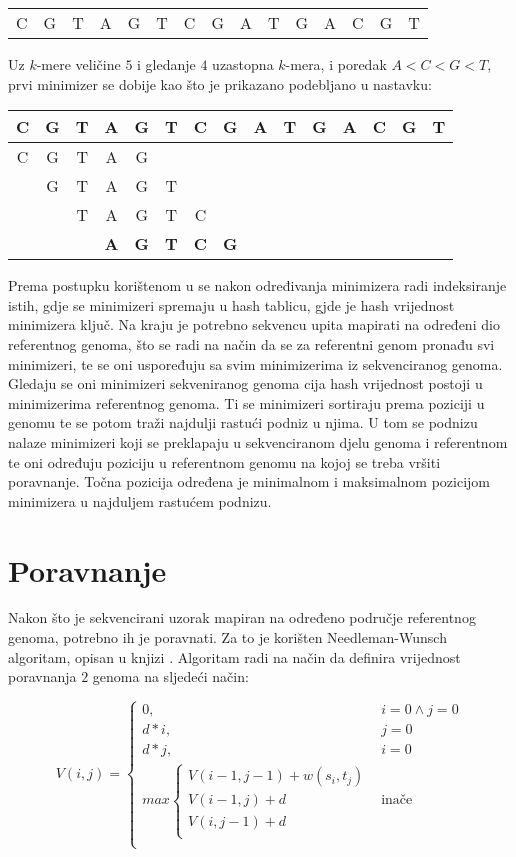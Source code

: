 \documentclass[times, utf8, seminar, numeric]{fer}
\begin{document}
\begin{tabular}{ccccccccccccccc }
    C&G&T&A&G&T&C&G&A&T&G&A&C&G&T\\
\end{tabular}

Uz $k$-mere veličine $5$ i gledanje $4$ uzastopna $k$-mera, i poredak $A<C<G<T$, prvi minimizer se dobije kao što je prikazano podebljano u nastavku:

\begin{tabular}{ccccccccccccccc }
    C&G&T&A&G&T&C&G&A&T&G&A&C&G&T\\ \hline
    C&G&T&A&G&&&&&&&&&&\\
    &G&T&A&G&T&&&&&&&&&\\
    &&T&A&G&T&C&&&&&&&&\\
    &&&\textbf{A}&\textbf{G}&\textbf{T}&\textbf{C}&\textbf{G}&&&&&&&\\
\end{tabular}

Prema postupku korištenom u \cite{minimap} se nakon određivanja minimizera radi indeksiranje istih, gdje se minimizeri spremaju u hash tablicu, gjde je hash vrijednost minimizera ključ.
Na kraju je potrebno sekvencu upita mapirati na određeni dio referentnog genoma, što se radi na način da se za referentni genom pronađu svi minimizeri, te se oni uspoređuju sa svim minimizerima iz sekvenciranog genoma.
Gledaju se oni minimizeri sekveniranog genoma cija hash vrijednost postoji u minimizerima referentnog genoma.
Ti se minimizeri sortiraju prema poziciji u genomu te se potom traži najdulji rastući podniz u njima.
U tom se podnizu nalaze minimizeri koji se preklapaju u sekvenciranom djelu genoma i referentnom te oni određuju poziciju u referentnom genomu na kojoj se treba vršiti poravnanje.
Točna pozicija određena je minimalnom i maksimalnom pozicijom minimizera u najduljem rastućem podnizu.

\section{Poravnanje}
Nakon što je sekvencirani uzorak mapiran na određeno područje referentnog genoma, potrebno ih je poravnati.
Za to je korišten Needleman-Wunsch algoritam, opisan u knjizi \cite{skripta}.
Algoritam radi na način da definira vrijednost poravnanja $2$ genoma na sljedeći način:

\[
    V(i, j) = 
    \begin{cases}
        0,    & i = 0 \wedge j = 0\\
        d * i,& j = 0              \\
        d * j,& i = 0              \\
        max 
        \begin{cases}
            V(i-1, j-1) + w(s_i, t_j)\\
            V(i-1, j) + d\\
            V(i,j-1) + d\\
        \end{cases}
        & \text{inače}\\
    \end{cases}
\]
\end{document}
